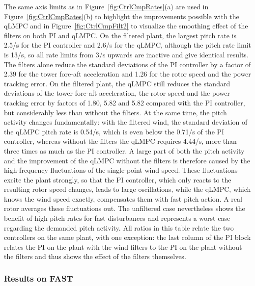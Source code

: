 The same axis limits as in Figure~\ref{fig:CtrlCmpRates}(a) are used in Figure~\ref{fig:CtrlCmpRates}(b) to highlight the improvements possible with the qLMPC and in Figure~\ref{fig:CtrlCmpFilt2} to visualize the smoothing effect of the filters on both PI and qLMPC. On the filtered plant, the largest pitch rate is 2.5\textdegree/s for the PI controller and 2.6\textdegree/s for the qLMPC, although the pitch rate limit is 13\textdegree/s, so all rate limits from 3\textdegree/s upwards are inactive and give identical results. The filters alone reduce the standard deviations of the PI controller by a factor of 2.39 for the tower fore-aft acceleration and 1.26 for the rotor speed and the power tracking error. On the filtered plant, the qLMPC still reduces the standard deviations of the tower fore-aft acceleration, the rotor speed and the power tracking error by factors of 1.80, 5.82 and 5.82 compared with the PI controller, but considerably less than without the filters. At the same time, the pitch activity changes fundamentally: with the filtered wind, the standard deviation of the qLMPC pitch rate is 0.54\textdegree/s, which is even below the 0.71\textdegree/s of the PI controller, whereas without the filters the qLMPC requires 4.44\textdegree/s, more than three times as much as the PI controller. A large part of both the pitch activity and the improvement of the qLMPC without the filters is therefore caused by the high-frequency fluctuations of the single-point wind speed. These fluctuations excite the plant strongly, so that the PI controller, which only reacts to the resulting rotor speed changes, leads to large oscillations, while the qLMPC, which knows the wind speed exactly, compensates them with fast pitch action. A real rotor averages these fluctuations out. The unfiltered case nevertheless shows the benefit of high pitch rates for fast disturbances and represents a worst case regarding the demanded pitch activity.
%
All ratios in this table relate the two controllers on the same plant, with one exception: the last column of the PI block relates the PI on the plant with the wind filters to the PI on the plant without the filters and thus shows the effect of the filters themselves.

\subsubsection{Results on FAST}\label{subsubsec:qLMPCFASTresults}

